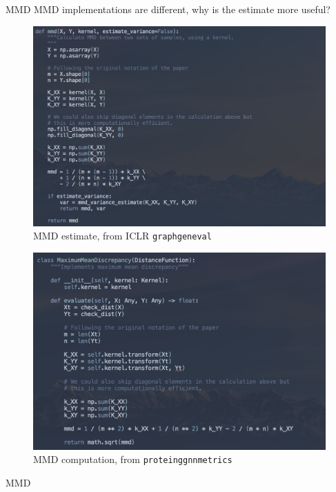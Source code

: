 \documentclass[aspectratio=169, 10pt, dvipsnames, handout]{beamer}
\begin{document}
\begin{frame}[fragile]{MMD}
  MMD implementations are different, why is the estimate more useful?\\
  \begin{minipage}{.45\textwidth}
  \begin{figure}
    \centering
    \includegraphics[width=\textwidth]{figures/mmd_estimate.png}
    \caption{MMD estimate, from ICLR \texttt{graphgeneval}}
    \label{fig:mmd_estimate}
  \end{figure}
  \end{minipage}%
  \hfill
  \begin{minipage}{.45\textwidth}
  \begin{figure}
    \centering
    \includegraphics[width=\textwidth]{figures/mmd_current.png}
    \caption{MMD computation, from \texttt{proteinggnnmetrics}}
    \label{fig:mmd_current}
  \end{figure}
\end{minipage}
\end{frame}


\begin{frame}[fragile]{MMD}

\end{frame}
\end{document}
